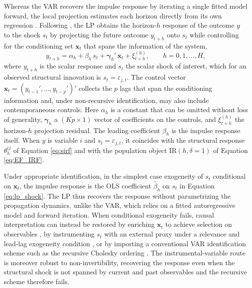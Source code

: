 Whereas the VAR recovers the impulse response by iterating a single fitted model forward, the
local projection estimates each horizon directly from its own regression
\parencite{jorda2005estimation}. Following \textcite{jorda2025local}, the LP obtains the
horizon-$h$ response of the outcome $y$ to the shock $s_t$ by projecting the future outcome
$y_{t+h}$ onto $s_t$ while controlling for the conditioning set $\mathbf{x}_t$ that spans the
information of the system,
%
\begin{equation}
    y_{t+h} = \alpha_h + \beta_h\, s_t
            + \boldsymbol{\gamma}_h'\, \mathbf{x}_t
            + \xi_{t+h}^{(h)},
    \qquad h = 0, 1, \ldots, H,
    \label{eq:lp_shock}
\end{equation}
%
where $y_{t+h}$ is the scalar response and $s_t$ the scalar shock of interest, which for an
observed structural innovation is $s_t = \varepsilon_{j,t}$. The control vector
$\mathbf{x}_t = (y_{t-1}', \ldots, y_{t-p}')'$ collects the $p$ lags that span the conditioning
information and, under non-recursive identification, may also include contemporaneous controls.
Here $\alpha_h$ is a constant that can be omitted without loss of generality,
$\boldsymbol{\gamma}_h$ a $(Kp \times 1)$ vector of coefficients on the controls, and
$\xi_{t+h}^{(h)}$ the horizon-$h$ projection residual. The leading coefficient $\beta_h$ is the
impulse response itself. When $y$ is variable $i$ and $s_t = \varepsilon_{j,t}$, it coincides with
the structural response $\theta_h^{ij}$ of Equation \eqref{eq:sirf} and with the population object
$\mathrm{IR}(h,\delta = 1)$ of Equation \eqref{eq:EF_IRF}.

Under appropriate identification, in the simplest case exogeneity of $s_t$ conditional on
$\mathbf{x}_t$, the impulse response is the OLS coefficient $\hat{\beta}_h$ on $s_t$ in
Equation \eqref{eq:lp_shock}. The LP thus recovers the response without parametrizing the
propagation dynamics, unlike the VAR, which relies on a fitted autoregressive model and forward
iteration. When conditional exogeneity fails, causal interpretation can instead be restored by
enriching $\mathbf{x}_t$ to achieve selection on observables \parencite{olea2025local}, by
instrumenting $s_t$ with an external proxy under a relevance and lead-lag exogeneity condition
\parencite{stock2018identification,jorda2015betting}, or by importing a conventional VAR
identification scheme such as the recursive Cholesky ordering \parencite{plagborg2021local}. The
instrumental-variable route is moreover robust to non-invertibility, recovering the response even
when the structural shock is not spanned by current and past observables and the recursive scheme
therefore fails.

